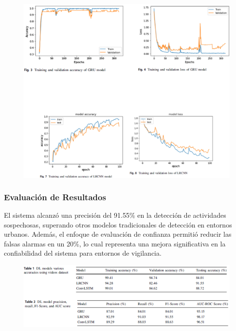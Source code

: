 \documentclass[listof=nochaptergap,12pt,times,authoryear]{report}
\begin{document}
\begin{figure}[h] %
    \centering
    \includegraphics[width=1.1\textwidth]{entre 3.png} %
    \label{fig:ejemplo} %
\end{figure}

\clearpage


\subsubsection{Evaluación de Resultados}
El sistema alcanzó una precisión del 91.55\% en la detección de actividades sospechosas, superando otros modelos tradicionales de detección en entornos urbanos. Además, el enfoque de evaluación de confianza permitió reducir las falsas alarmas en un 20\%, lo cual representa una mejora significativa en la confiabilidad del sistema para entornos de vigilancia.

\begin{figure}[h] %
    \centering
    \includegraphics[width=1.0\textwidth]{entre 3.1.png} %
    \label{fig:ejemplo} %
\end{figure}
\end{document}

